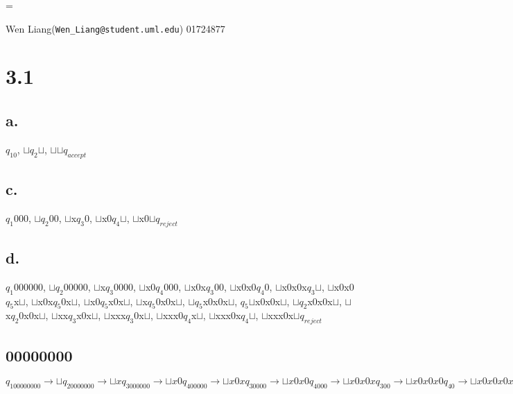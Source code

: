 \documentclass{scrartcl}
\newcommand{\bl}{{\sqcup}}
\begin{document}
\hfuzz=\maxdimen
{}
\begin{center}
Wen Liang(\texttt{Wen\_Liang@student.uml.edu}) 01724877
\end{center}
\section*{3.1}
\subsection*{a.}
$q_10$,	$\sqcup$$q_2$$\sqcup$, $\sqcup$$\sqcup$$q_{accept}$ 

\subsection*{c.}
$q_1$000, $\sqcup$$q_2$00, $\sqcup$x$q_3$0, $\sqcup$x0$q_4$$\sqcup$, $\sqcup$x0$\sqcup$$q_{reject}$

\subsection*{d.}
$q_1$000000, $\sqcup$$q_2$00000, $\sqcup$x$q_3$0000, $\sqcup$x0$q_4$000,
$\sqcup$x0x$q_3$00, $\sqcup$x0x0$q_4$0, $\sqcup$x0x0x$q_3$$\sqcup$, $\sqcup$x0x0$q_5$x$\sqcup$, $\sqcup$x0x$q_5$0x$\sqcup$, $\sqcup$x0$q_5$x0x$\sqcup$, $\sqcup$x$q_5$0x0x$\sqcup$, $\sqcup$$q_5$x0x0x$\sqcup$, $q_5$$\sqcup$x0x0x$\sqcup$, $\sqcup$$q_2$x0x0x$\sqcup$, $\sqcup$x$q_2$0x0x$\sqcup$, $\sqcup$xx$q_3$x0x$\sqcup$, $\sqcup$xxx$q_3$0x$\sqcup$,
$\sqcup$xxx0$q_4$x$\sqcup$, $\sqcup$xxx0x$q_4$$\sqcup$, $\sqcup$xxx0x$\sqcup$$q_{reject}$
\subsection*{00000000}
$q_100000000\to \bl q_20000000\to \bl xq_3000000\to \bl x0q_400000\to \bl x0xq_30000\to
\bl x0x0q_4000\to \bl x0x0xq_300\to \bl x0x0x0q_40\to \bl x0x0x0xq_3\bl\to \bl x0x0x0q_5x\bl\to \bl x0x0xq_50x\bl\to \bl x0x0q_5x0x\bl\to \bl x0xq_50x0x\bl\to
\bl x0q_5x0x0x\bl\to \bl xq_50x0x0x\bl\to \bl q_5x0x0x0x\bl\to q_5\bl x0x0x0x\bl\to
\bl q_2x0x0x0x\bl\to \bl xq_20x0x0x\bl\to \bl xxq_3x0x0x\bl\to \bl xxxq_30x0x\bl
\to \bl xxx0q_4x0x\bl\to \bl xxx0xq_40x\bl\to \bl xxx0xxq_3x\bl\to \bl xxx0xxxq_3\bl\to \bl xxx0xxq_5x\bl\to \bl xxx0xq_5xx\bl\to \bl xxx0q_5xxx\bl
\to \bl xxxq_50xxx\bl\to \bl xxq_5x0xxx\bl\to \bl xq_5xx0xxx\bl\to \bl q_5xxx0xxx\bl\to q_5\bl xxx0xxx\bl\to \bl q_2xxx0xxx\bl\to \bl xq_2xx0xxx\bl\to \bl xxq_2x0xxx\bl\to \bl xxxq_20xxx\bl\to \bl xxxxq_3xxx\bl\to \bl xxxxxq_3xx\bl
\to \bl xxxxxxq_3x\bl\to \bl xxxxxxxq_3\bl\to \bl xxxxxxq_5x\bl\to \bl xxxxxq_5xx\bl\to \bl xxxxq_5xxx\bl\to \bl xxxq_5xxxx\bl\to \bl xxq_5xxxxx\bl\to \bl xq_5xxxxxx\bl\to \bl q_5xxxxxxx\bl\to q_5\bl xxxxxxx\bl\to \bl q_2xxxxxxx\bl\to \bl xq_2xxxxxx\bl\to \bl xxq_2xxxxx\bl\to \bl xxxq_2xxxx\bl\to \bl xxxxq_2xxx\bl\to \bl xxxxxq_2xx\bl\to \bl xxxxxxq_2x\bl\to \bl xxxxxxxq_2\bl
\to \bl xxxxxxx\bl q_{accept} $
\end{document}
